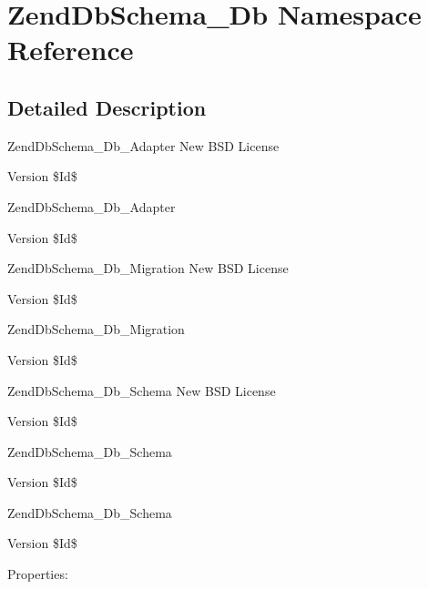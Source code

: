\hypertarget{namespaceZendDbSchema__Db}{\section{\-Zend\-Db\-Schema\-\_\-\-Db \-Namespace \-Reference}
\label{namespaceZendDbSchema__Db}
}


\subsection{\-Detailed \-Description}
\-Zend\-Db\-Schema\-\_\-\-Db\-\_\-\-Adapter  \-New \-B\-S\-D \-License \begin{DoxyVersion}{\-Version}
\$\-Id\$
\end{DoxyVersion}
\-Zend\-Db\-Schema\-\_\-\-Db\-\_\-\-Adapter \begin{DoxyVersion}{\-Version}
\$\-Id\$
\end{DoxyVersion}
\-Zend\-Db\-Schema\-\_\-\-Db\-\_\-\-Migration  \-New \-B\-S\-D \-License \begin{DoxyVersion}{\-Version}
\$\-Id\$
\end{DoxyVersion}
\-Zend\-Db\-Schema\-\_\-\-Db\-\_\-\-Migration \begin{DoxyVersion}{\-Version}
\$\-Id\$
\end{DoxyVersion}
\-Zend\-Db\-Schema\-\_\-\-Db\-\_\-\-Schema  \-New \-B\-S\-D \-License \begin{DoxyVersion}{\-Version}
\$\-Id\$
\end{DoxyVersion}
\-Zend\-Db\-Schema\-\_\-\-Db\-\_\-\-Schema \begin{DoxyVersion}{\-Version}
\$\-Id\$
\end{DoxyVersion}
\-Zend\-Db\-Schema\-\_\-\-Db\-\_\-\-Schema \begin{DoxyVersion}{\-Version}
\$\-Id\$
\end{DoxyVersion}
\-Properties\-: 